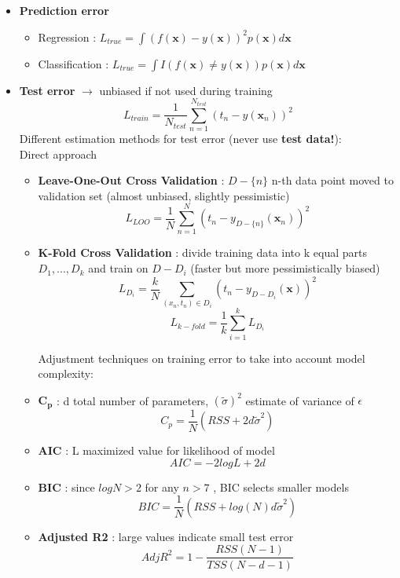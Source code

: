 \documentclass[12pt]{article} %
\begin{document}
\begin{itemize}
\item \textbf{Prediction error} 
\begin{itemize}
\item Regression : $L_{true} = \int (f(\bm{x}) - y(\bm{x}))^2p(\bm{x})d\bm{x}$
\item Classification : $L_{true} = \int I(f(\bm{x}) \neq y(\bm{x}))p(\bm{x})d\bm{x}$
\end{itemize}


\item \textbf{Test error} $\rightarrow$ unbiased if not used during training
 $$ L_{train} = \frac{1}{N_{test}} \sum \limits_{n=1}^{N_{test}} (t_n - y(\bm{x}_n))^2$$
Different estimation methods for test error (never use \textbf{test data!}):\\
Direct approach
\begin{itemize}
\item \textbf{Leave-One-Out Cross Validation} : $D-\{n\}$ n-th data point moved to validation set (almost unbiased, slightly pessimistic)
$$ L_{LOO} = \frac{1}{N} \sum \limits_{n=1}^N (t_n - y_{D-\{n\}}(\bm{x}_n))^2 $$

\item \textbf{K-Fold Cross Validation} : divide training data into k equal parts $D_1 ,...,D_k$ and train on $D-D_i$ (faster but more pessimistically biased)
$$ L_{D_i} = \frac{k}{N} \sum \limits_{(x_n,t_n) \in D_i}(t_n - y_{D-D_i}(\bm{x}))^2$$
$$ L_{k-fold} = \frac{1}{k} \sum \limits_{i=1}^k L_{D_i}$$

Adjustment techniques on training error to take into account model complexity:
\item $\bm{C_p}$ : d total number of parameters, $(\tilde\sigma )^2$ estimate of variance of $\epsilon$
$$ C_p = \frac{1}{N}(RSS + 2d\tilde{\sigma}^2)$$
\item \textbf{AIC} : L maximized value for likelihood of model 
$$ AIC = -2logL+2d$$
\item \textbf{BIC} : since $logN > 2$ for any $n>7$ , BIC selects smaller models
$$ BIC = \frac{1}{N}(RSS+ log(N)d \tilde{\sigma}^2)$$

\item \textbf{Adjusted R2} : large values indicate small test error
$$ AdjR^2 = 1 - \frac{RSS (N-1)}{TSS(N-d-1)}$$
\end{itemize}

\end{itemize}
\end{document}
